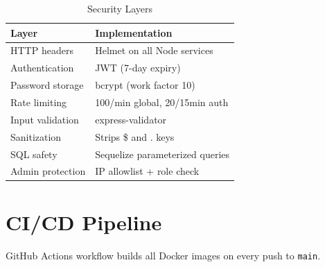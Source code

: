 \begin{table}[htbp]
  \centering
  \caption{Security Layers}
  \label{tab:security}
  \begin{tabular}{@{}ll@{}}
    \toprule
    \textbf{Layer} & \textbf{Implementation} \\
    \midrule
    HTTP headers     & Helmet on all Node services \\
    Authentication   & JWT (7-day expiry) \\
    Password storage & bcrypt (work factor 10) \\
    Rate limiting    & 100/min global, 20/15min auth \\
    Input validation & express-validator \\
    Sanitization     & Strips \$ and . keys \\
    SQL safety       & Sequelize parameterized queries \\
    Admin protection & IP allowlist + role check \\
    \bottomrule
  \end{tabular}
\end{table}

\section{CI/CD Pipeline}
GitHub Actions workflow builds all Docker images on every push to \texttt{main}.
